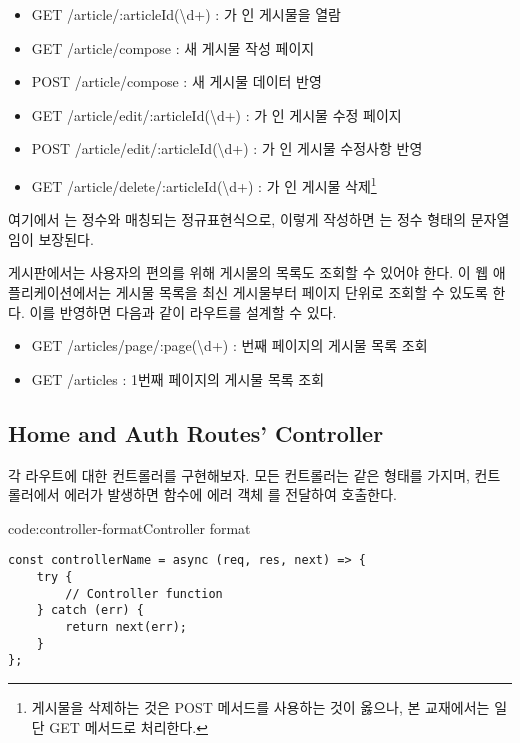 \begin{itemize}
    \item GET /article/:articleId(\textbackslash{}d+) : 가 인 게시물을 열람
    \item GET /article/compose : 새 게시물 작성 페이지
    \item POST /article/compose : 새 게시물 데이터 반영
    \item GET /article/edit/:articleId(\textbackslash{}d+) : 가 인 게시물 수정 페이지
    \item POST /article/edit/:articleId(\textbackslash{}d+) : 가 인 게시물 수정사항 반영
    \item GET /article/delete/:articleId(\textbackslash{}d+) : 가 인 게시물 삭제\footnote{게시물을 삭제하는 것은 POST 메서드를 사용하는 것이 옳으나, 본 교재에서는 일단 GET 메서드로 처리한다.}
\end{itemize}

여기에서 는 정수와 매칭되는 정규표현식으로, 이렇게 작성하면 는 정수 형태의 문자열임이 보장된다.

게시판에서는 사용자의 편의를 위해 게시물의 목록도 조회할 수 있어야 한다. 이 웹 애플리케이션에서는 게시물 목록을 최신 게시물부터 페이지 단위로 조회할 수 있도록 한다. 이를 반영하면 다음과 같이 라우트를 설계할 수 있다.

\begin{itemize}
    \item GET /articles/page/:page(\textbackslash{}d+) : 번째 페이지의 게시물 목록 조회
    \item GET /articles : 1번째 페이지의 게시물 목록 조회
\end{itemize}

\subsection*{Home and Auth Routes' Controller}

각 라우트에 대한 컨트롤러를 구현해보자. 모든 컨트롤러는 \와 같은 형태를 가지며, 컨트롤러에서 에러가 발생하면  함수에 에러 객체 를 전달하여 호출한다.

\begin{code}{code:controller-format}{Controller format}
\begin{verbatim}
const controllerName = async (req, res, next) => {
    try {
        // Controller function
    } catch (err) {
        return next(err);
    }
};
\end{verbatim}
\end{code}


